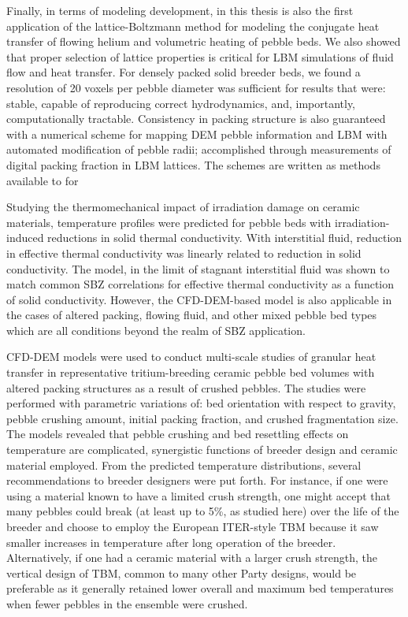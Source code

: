 Finally, in terms of modeling development, in this thesis is also the first application of the lattice-Boltzmann method for modeling the conjugate heat transfer of flowing helium and volumetric heating of pebble beds. We also showed that proper selection of lattice properties is critical for LBM simulations of fluid flow and heat transfer. For densely packed solid breeder beds, we found a resolution of 20 voxels per pebble diameter was sufficient for results that were: stable, capable of reproducing correct hydrodynamics, and, importantly, computationally tractable. Consistency in packing structure is also guaranteed with a numerical scheme for mapping DEM pebble information and LBM with automated  modification of pebble radii; accomplished through measurements of digital packing fraction in LBM lattices. The schemes are written as methods available to for 

Studying the thermomechanical impact of irradiation damage on ceramic materials, temperature profiles were predicted for pebble beds with irradiation-induced reductions in solid thermal conductivity. With interstitial fluid, reduction in effective thermal conductivity was linearly related to reduction in solid conductivity. The model, in the limit of stagnant interstitial fluid was shown to match common SBZ correlations for effective thermal conductivity as a function of solid conductivity. However, the CFD-DEM-based model is also applicable in the cases of altered packing, flowing fluid, and other mixed pebble bed types which are all conditions beyond the realm of SBZ application.

CFD-DEM models were used to conduct multi-scale studies of granular heat transfer in representative tritium-breeding ceramic pebble bed volumes with altered packing structures as a result of crushed pebbles. The studies were performed with parametric variations of: bed orientation with respect to gravity, pebble crushing amount, initial packing fraction, and crushed fragmentation size. The models revealed that pebble crushing and bed resettling effects on temperature are complicated, synergistic functions of breeder design and ceramic material employed. From the predicted temperature distributions, several recommendations to breeder designers were put forth. For instance, if one were using a material known to have a limited crush strength, one might accept that many pebbles could break (at least up to 5\%, as studied here) over the life of the breeder and choose to employ the European ITER-style TBM because it saw smaller increases in temperature after long operation of the breeder. Alternatively, if one had a ceramic material with a larger crush strength, the vertical design of TBM, common to many other Party designs, would be preferable as it generally retained lower overall and maximum bed temperatures when fewer pebbles in the ensemble were crushed.


